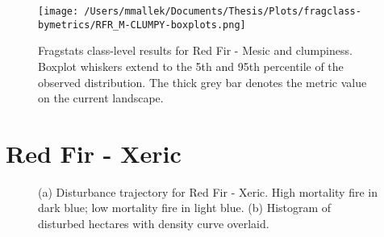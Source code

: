 \begin{figure}[!htbp]
\centering
    \texttt{[image: /Users/mmallek/Documents/Thesis/Plots/fragclass-bymetrics/RFR\_M-CLUMPY-boxplots.png]}
  \caption{Fragstats class-level results for Red Fir - Mesic and clumpiness. Boxplot whiskers extend to the 5th and 95th percentile of the observed distribution. The thick grey bar denotes the metric value on the current landscape.}
  \label{fig:rfrm_clumpy}
\end{figure}


\clearpage
\section{Red Fir - Xeric} 

\begin{figure}[!htbp]
  \centering
  \caption{\small (a) Disturbance trajectory for Red Fir - Xeric. High mortality fire in dark blue; low mortality fire in light blue. (b) Histogram of disturbed hectares with density curve overlaid.} 
  \label{fig:darea_rfrx}
\end{figure}


